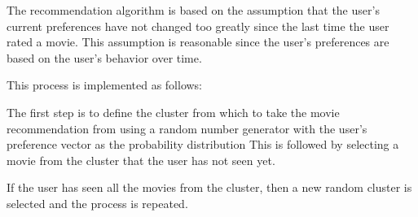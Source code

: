 The recommendation algorithm is based on the assumption that the user's current preferences have not changed too greatly since the last time the user rated a movie. This assumption is reasonable since the user's preferences are based on the user's behavior over time.

This process is implemented as follows:

The first step is to define the cluster from which to take the movie recommendation from using a random number generator with the user's preference vector as the probability distribution
This is followed by selecting a movie from the cluster that the user has not seen yet.%

If the user has seen all the movies from the cluster, then a new random cluster is selected and the process is repeated.

